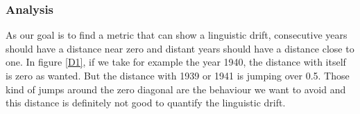 \subsubsection{Analysis}

As our goal is to find a metric that can show a linguistic drift, consecutive years should have a distance near zero and distant years should have a distance close to one. In figure \ref{D1}, if we take for example the year 1940, the distance with itself is zero as wanted. But the distance with 1939 or 1941 is jumping over 0.5. Those kind of jumps around the zero diagonal are the behaviour we want to avoid and this distance is definitely not good to quantify the linguistic drift.
